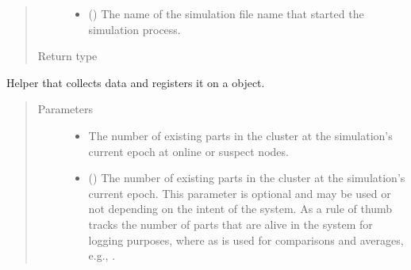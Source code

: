 \documentclass[letterpaper,10pt,english]{sphinxmanual}
\begin{document}
\begin{fulllineitems}
\begin{fulllineitems}
\begin{quote}
\begin{description}
\begin{itemize}
\item {} 
 () \textendash{} The name of the simulation file name that started
the simulation process.

\end{itemize}

\item[{Return type}] \leavevmode
{}

\end{description}\end{quote}

\end{fulllineitems}


\begin{fulllineitems}
\label{\detokenize{app.domain:app.domain.cluster_groups.SGCluster._log_evaluation}}
Helper that collects  data and registers it on a
{\hyperref[\detokenize{app.domain.helpers:app.domain.helpers.smart_dataclasses.LoggingData}]{}}
object.
\begin{quote}\begin{description}
\item[{Parameters}] \leavevmode\begin{itemize}
\item {} 
 \textendash{} The number of existing parts in the cluster at the
simulation’s current epoch at online or suspect nodes.

\item {} 
 () \textendash{} The number of existing parts in the cluster at the
simulation’s current epoch. This parameter is optional and
may be used or not depending on the intent of the system.
As a rule of thumb  tracks the number of parts that
are alive in the system for logging purposes, where as
 is used for comparisons and averages, e.g.,
{\hyperref[\detokenize{app.domain:app.domain.cluster_groups.SGCluster.evaluate}]{}}.


\end{itemize}
\end{description}
\end{quote}
\end{fulllineitems}
\end{fulllineitems}
\end{document}
